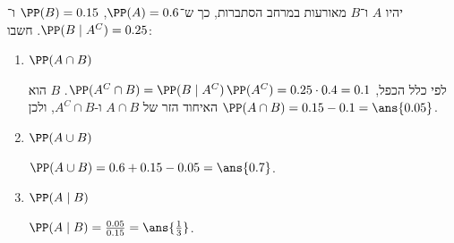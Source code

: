 יהיו $A$ ו־$B$ מאורעות במרחב הסתברות, כך ש־$\PP(A)=0.6$, $\PP(B)=0.15$ ו־$\PP(B\mid A^C)=0.25$. חשבו:
\begin{enumerate}
\item $\PP(A\cap B)$
\begin{solbox}
לפי כלל הכפל, $\PP(A^C\cap B)=\PP(B\mid A^C)\,\PP(A^C)=0.25\cdot0.4=0.1$.
$B$ הוא האיחוד הזר של $A\cap B$ ו-$A^C\cap B$, ולכן $\PP(A\cap B)=0.15-0.1=\ans{0.05}$.
\end{solbox}
\item $\PP(A\cup B)$
\begin{solbox}
$\PP(A\cup B)=0.6+0.15-0.05=\ans{0.7}$.
\end{solbox}
\item $\PP(A\mid B)$
\begin{solbox}
$\PP(A\mid B)=\frac{0.05}{0.15}=\ans{\frac13}$.
\end{solbox}
\end{enumerate}
